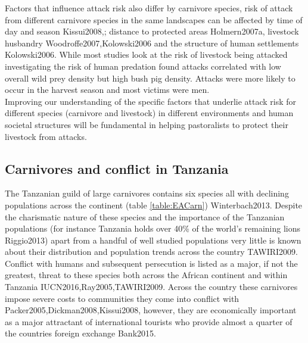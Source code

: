 Factors that influence attack risk also differ by carnivore species, risk of attack from different carnivore species in the same landscapes can be affected by time of day and season {Kissui2008,}; distance to protected areas {Holmern2007a}, livestock husbandry {Woodroffe2007,Kolowski2006} and the structure of human settlements {Kolowski2006}. While most studies look at the risk of livestock being attacked \citet{Packer2005} investigating the risk of human predation found attacks correlated with low overall wild prey density but high bush pig density. Attacks were more likely to occur in the harvest season and most victims were men.\\

Improving our understanding of the specific factors that underlie attack risk for different species (carnivore and livestock) in different environments and human societal structures will be fundamental in helping pastoralists to protect their livestock from attacks.\\

\subsection{Carnivores and conflict in Tanzania}

The Tanzanian guild of large carnivores contains six species all with declining populations across the continent (table \ref{table:EACarn}) {Winterbach2013}. Despite the charismatic nature of these species and the importance of the Tanzanian populations (for instance Tanzania holds over 40\% of the world's remaining lions {Riggio2013}) apart from a handful of well studied populations very little is known about their distribution and population trends across the country {TAWIRI2009}. Conflict with humans and subsequent persecution is listed as a major, if not the greatest, threat to these species both across the African continent and within Tanzania {IUCN2016,Ray2005,TAWIRI2009}. Across the country these carnivores impose severe costs to communities they come into conflict with {Packer2005,Dickman2008,Kissui2008}, however, they are economically important as a major attractant of international tourists who provide almost a quarter of the countries foreign exchange {Bank2015}. 
\\

